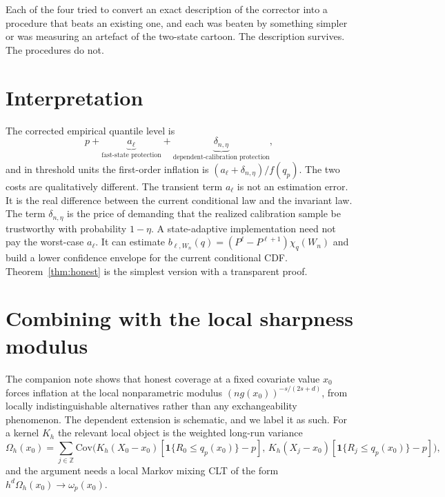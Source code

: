 \documentclass[11pt]{article}
\theoremstyle{definition}
\theoremstyle{remark}
\newcommand{\Cov}{\mathrm{Cov}}
\newcommand{\one}{\mathbf{1}}
\begin{document}
Each of the four tried to convert an exact description of the
corrector into a procedure that beats an existing one, and each was beaten by something simpler or
was measuring an artefact of the two-state cartoon. The description survives. The procedures do not.

\section{Interpretation}\label{sec:interp}

The corrected empirical quantile level is
\begin{equation}\label{eq:corrected-level}
  p + \underbrace{a_\ell}_{\text{fast-state protection}}
    + \underbrace{\delta_{n,\eta}}_{\text{dependent-calibration protection}} ,
\end{equation}
and in threshold units the first-order inflation is $(a_\ell+\delta_{n,\eta})/f(q_p)$. The two
costs are qualitatively different. The transient term $a_\ell$ is not an estimation error. It
is the real difference between the current conditional law and the invariant law. The term
$\delta_{n,\eta}$ is the price of demanding that the realized calibration sample be
trustworthy with probability $1-\eta$. A state-adaptive implementation need not pay the
worst-case $a_\ell$. It can estimate $b_{\ell,W_n}(q)=(P^\ell-P^{\ell+1})\chi_q(W_n)$ and build
a lower confidence envelope for the current conditional CDF. Theorem~\ref{thm:honest} is the
simplest version with a transparent proof.

\section{Combining with the local sharpness modulus}\label{sec:modulus}

The companion note \citep{cotton2026honest} shows that honest coverage at a fixed covariate
value $x_0$ forces inflation at the local nonparametric modulus $(n g(x_0))^{-s/(2s+d)}$, from
locally indistinguishable alternatives rather than any exchangeability phenomenon. The
dependent extension is schematic, and we label it as such. For a kernel $K_h$ the relevant
local object is the weighted long-run variance
\begin{equation}\label{eq:omegah}
  \Omega_h(x_0) = \sum_{j\in\mathbb{Z}} \Cov\Big(K_h(X_0-x_0)[\one\{R_0\le q_p(x_0)\}-p],\,
    K_h(X_j-x_0)[\one\{R_j\le q_p(x_0)\}-p]\Big),
\end{equation}
and the argument needs a local Markov mixing CLT of the form $h^d\Omega_h(x_0)\to
\omega_p(x_0)$.
\end{document}
